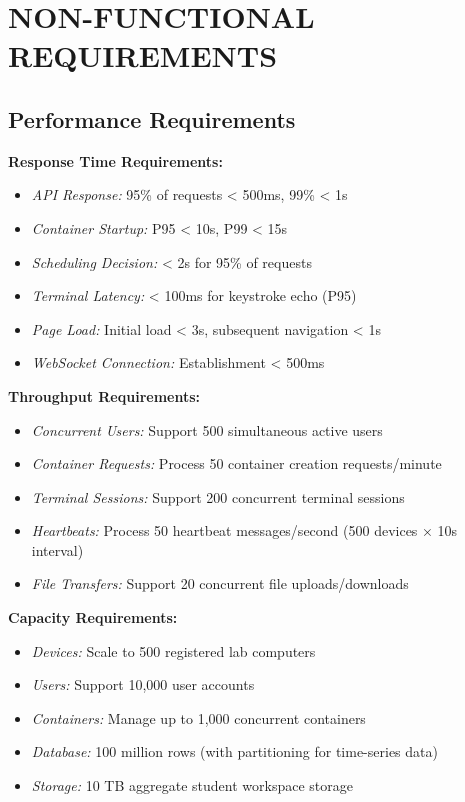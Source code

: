 \documentclass[12pt,a4paper]{article}
\begin{document}
\newpage
\section{NON-FUNCTIONAL REQUIREMENTS}
\label{sec:nonfunc}

\subsection{Performance Requirements}
\label{sec:performance}

\textbf{Response Time Requirements:}

\begin{itemize}
    \item \textit{API Response:} 95\% of requests < 500ms, 99\% < 1s
    \item \textit{Container Startup:} P95 < 10s, P99 < 15s
    \item \textit{Scheduling Decision:} < 2s for 95\% of requests
    \item \textit{Terminal Latency:} < 100ms for keystroke echo (P95)
    \item \textit{Page Load:} Initial load < 3s, subsequent navigation < 1s
    \item \textit{WebSocket Connection:} Establishment < 500ms
\end{itemize}

\textbf{Throughput Requirements:}

\begin{itemize}
    \item \textit{Concurrent Users:} Support 500 simultaneous active users
    \item \textit{Container Requests:} Process 50 container creation requests/minute
    \item \textit{Terminal Sessions:} Support 200 concurrent terminal sessions
    \item \textit{Heartbeats:} Process 50 heartbeat messages/second (500 devices × 10s interval)
    \item \textit{File Transfers:} Support 20 concurrent file uploads/downloads
\end{itemize}

\textbf{Capacity Requirements:}

\begin{itemize}
    \item \textit{Devices:} Scale to 500 registered lab computers
    \item \textit{Users:} Support 10,000 user accounts
    \item \textit{Containers:} Manage up to 1,000 concurrent containers
    \item \textit{Database:} 100 million rows (with partitioning for time-series data)
    \item \textit{Storage:} 10 TB aggregate student workspace storage
\end{itemize}
\end{document}

